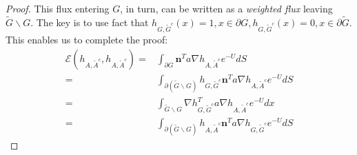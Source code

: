 \documentclass[english, aip, jcp, priprint, graphicx,floatfix]{revtex4-1}
\newtheorem{definition}{Definition}
\theoremstyle{plain}
\newtheorem*{lem*}{\protect\lemmaname}
\theoremstyle{definition}
\theoremstyle{plain}
\providecommand{\lemmaname}{Lemma}
\begin{document}
\begin{proof}
This flux entering $G$, in turn, can be written as a \emph{weighted flux} leaving $\tilde G \backslash G$.  The key is to use fact that $h_{G,\tilde G^c}(x)=1,x\in \partial G,h_{G,\tilde G^c}(x)=0,x\in \partial \tilde G$.  This enables us to complete the proof:
\begin{align*}
\mathscr{E}(h_{A,\tilde A^c},h_{A,\tilde A^c})
    =&\int_{\partial G}  \textbf{n}^T a  \nabla h_{A, \tilde{A}^c} e^{- U } dS\\
    =& \int_{\partial (\tilde G \backslash G)}  h_{G, \tilde{G}^c}    \textbf{n}^T a  \nabla h_{A, \tilde{A}^c} e^{- U } dS\\
    =& \int_{\tilde G \backslash G}  \nabla h_{G, \tilde{G}^c}^T a  \nabla h_{A, \tilde{A}^c} e^{- U } dx\\
    =&\int_{\partial (\tilde G \backslash G)}  h_{A, \tilde{A}^c}    \textbf{n}^T a  \nabla h_{G, \tilde{G}^c} e^{- U } dS
\end{align*}
\end{proof}



\end{document}
